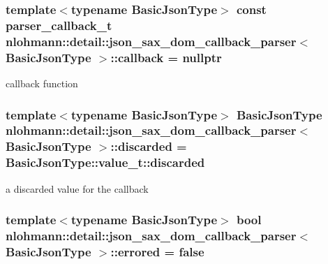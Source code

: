 \subsubsection[{\texorpdfstring{callback}{callback}}]{\setlength{\rightskip}{0pt plus 5cm}template$<$typename Basic\+Json\+Type$>$ const {\bf parser\+\_\+callback\+\_\+t} {\bf nlohmann\+::detail\+::json\+\_\+sax\+\_\+dom\+\_\+callback\+\_\+parser}$<$ Basic\+Json\+Type $>$\+::callback = nullptr\hspace{0.3cm}{\ttfamily [private]}}\hypertarget{classnlohmann_1_1detail_1_1json__sax__dom__callback__parser_a46a72dffd5be4a25602af00f0033c126}{}\label{classnlohmann_1_1detail_1_1json__sax__dom__callback__parser_a46a72dffd5be4a25602af00f0033c126}


callback function 

\subsubsection[{\texorpdfstring{discarded}{discarded}}]{\setlength{\rightskip}{0pt plus 5cm}template$<$typename Basic\+Json\+Type$>$ Basic\+Json\+Type {\bf nlohmann\+::detail\+::json\+\_\+sax\+\_\+dom\+\_\+callback\+\_\+parser}$<$ Basic\+Json\+Type $>$\+::discarded = Basic\+Json\+Type\+::value\+\_\+t\+::discarded\hspace{0.3cm}{\ttfamily [private]}}\hypertarget{classnlohmann_1_1detail_1_1json__sax__dom__callback__parser_a8997ee6dc3bd39116b951465b946445e}{}\label{classnlohmann_1_1detail_1_1json__sax__dom__callback__parser_a8997ee6dc3bd39116b951465b946445e}


a discarded value for the callback 

\subsubsection[{\texorpdfstring{errored}{errored}}]{\setlength{\rightskip}{0pt plus 5cm}template$<$typename Basic\+Json\+Type$>$ bool {\bf nlohmann\+::detail\+::json\+\_\+sax\+\_\+dom\+\_\+callback\+\_\+parser}$<$ Basic\+Json\+Type $>$\+::errored = false\hspace{0.3cm}{\ttfamily [private]}}\hypertarget{classnlohmann_1_1detail_1_1json__sax__dom__callback__parser_ab06baaa640cfaae5846daa7c3594b116}{}\label{classnlohmann_1_1detail_1_1json__sax__dom__callback__parser_ab06baaa640cfaae5846daa7c3594b116}


